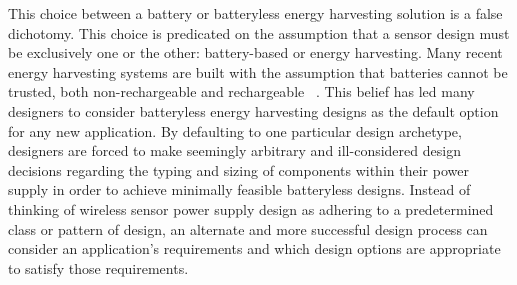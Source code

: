 This choice between a battery or batteryless energy harvesting solution is a false dichotomy.
This choice is predicated on the assumption that a sensor design must be exclusively one or the other: battery-based or energy harvesting.
Many recent energy harvesting systems are built with the assumption that batteries cannot be trusted, both non-rechargeable and rechargeable
~\cite{hesterNew17, hesterTragedy15, hesterFlicker17, hesterTimely17, hester2017future, colinReconfigurable18, luciaIntermittent17, yervaGrafting12, majid2020continuous}.
This belief has led many designers to consider batteryless energy harvesting designs as the default option for any new application. By defaulting to one particular design archetype, designers are forced to make seemingly arbitrary and ill-considered design decisions regarding the typing and sizing of components within their power supply in order to achieve minimally feasible batteryless designs.
Instead of thinking of wireless sensor power supply design as adhering to a predetermined class or pattern of design, an alternate and more successful design process can consider an application's requirements and which design options are appropriate to satisfy those requirements. 

